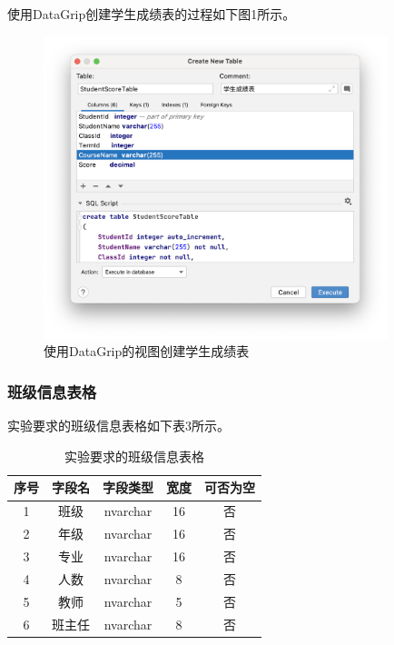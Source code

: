 \documentclass[a4paper,UTF8,heading=false,12pt]{article}
\begin{document}
    使用DataGrip创建学生成绩表的过程如下图1所示。

    \begin{figure}[htbp]
        \centering
        \includegraphics[width=10cm]{../Images/StudentScoreTable.png}
        \caption{使用DataGrip的视图创建学生成绩表}
    \end{figure}

    \subsubsection{班级信息表格}

    实验要求的班级信息表格如下表3所示。

    \begin{table}[htbp]
        \begin{center}
            \begin{tabular}{@{}ccccc@{}}
            \toprule
            序号 & 字段名  & 字段类型     & 宽度 & 可否为空 \\ \midrule
            1  & 班级   & nvarchar & 16 & 否    \\
            2  & 年级   & nvarchar & 16 & 否    \\
            3  & 专业   & nvarchar & 16 & 否    \\
            4  & 人数   & nvarchar & 8  & 否    \\
            5  & 教师   & nvarchar & 5  & 否    \\
            6  & 班主任   & nvarchar & 8 & 否   \\ \bottomrule
            \end{tabular}
            \caption{实验要求的班级信息表格}
        \end{center}
    \end{table}
\end{document}
